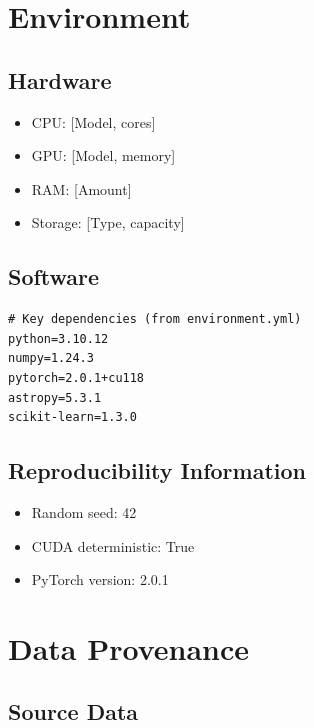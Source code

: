 \documentclass[12pt,modern,linenumbers]{aastex7}
\begin{document}
\section{Environment}

\subsection{Hardware}
\begin{itemize}
    \item CPU: [Model, cores]
    \item GPU: [Model, memory]
    \item RAM: [Amount]
    \item Storage: [Type, capacity]
\end{itemize}

\subsection{Software}
\begin{lstlisting}
# Key dependencies (from environment.yml)
python=3.10.12
numpy=1.24.3
pytorch=2.0.1+cu118
astropy=5.3.1
scikit-learn=1.3.0
\end{lstlisting}

\subsection{Reproducibility Information}
\begin{itemize}
    \item Random seed: 42
    \item CUDA deterministic: True
    \item PyTorch version: 2.0.1
\end{itemize}

\section{Data Provenance}

\subsection{Source Data}
\end{document}
